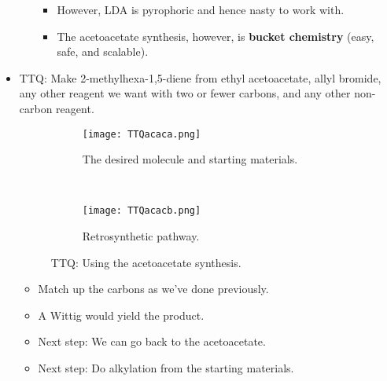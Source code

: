 \documentclass[../notes.tex]{subfiles}
\begin{document}
\begin{itemize}
\begin{itemize}
        \begin{itemize}
            \item However, LDA is pyrophoric and hence nasty to work with.
            \item The acetoacetate synthesis, however, is \textbf{bucket chemistry} (easy, safe, and scalable).
        \end{itemize}
    \end{itemize}
    \item TTQ: Make 2-methylhexa-1,5-diene from ethyl acetoacetate, allyl bromide, any other reagent we want with two or fewer carbons, and any other non-carbon reagent.
    \begin{figure}[H]
        \centering
        \begin{subfigure}[b]{\linewidth}
            \centering
            \texttt{[image: TTQacaca.png]}
            \caption{The desired molecule and starting materials.}
            \label{fig:TTQacaca}
        \end{subfigure}\\[1em]
        \begin{subfigure}[b]{\linewidth}
            \centering
            \texttt{[image: TTQacacb.png]}
            \caption{Retrosynthetic pathway.}
            \label{fig:TTQacacb}
        \end{subfigure}
        \caption{TTQ: Using the acetoacetate synthesis.}
        \label{fig:TTQacac}
    \end{figure}
    \begin{itemize}
        \item Match up the carbons as we've done previously.
        \item A Wittig would yield the product.
        \item Next step: We can go back to the acetoacetate.
        \item Next step: Do alkylation from the starting materials.
    \end{itemize}
\end{itemize}
\end{document}
